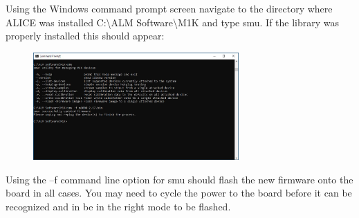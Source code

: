 \documentclass[12pt]{../manual}
\begin{document}
\begin{enumerate}
Using the Windows command prompt screen navigate to the directory where ALICE was installed C:\textbackslash ALM Software\textbackslash M1K and type smu. If the library was properly installed this should appear:
\begin{figure}[!ht]
\begin{center}
\includegraphics[width=0.7\textwidth]{figures/Troubleshooting9}
\end{center}
\end{figure}

Using the –f command line option for smu should flash the new firmware onto the board in all cases. You may need to cycle the power to the board before it can be recognized and in be in the right mode to be flashed.
\end{enumerate}
\end{document}
